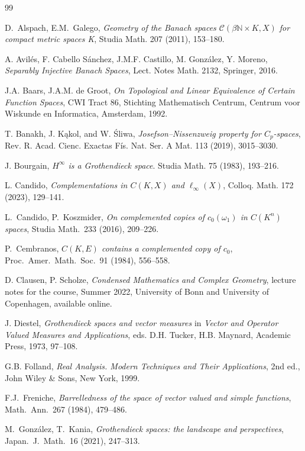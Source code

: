 \documentclass[12pt,fleqn]{amsart}
\numberwithin{equation}{section}
\theoremstyle{definition}
\def\C{\mathcal C}
\def\en{\mathbb N}
\begin{document}
\begin{thebibliography}{99}

 D.\ Alspach, E.M.\  Galego, {\em Geometry of the Banach spaces $\C(\beta\en\times K,X)$ for compact metric spaces K},
 Studia Math. 207 (2011),  153--180.

 A. Avil\'es, F. Cabello S\'anchez, J.M.F. Castillo, M. Gonz\'alez, Y. Moreno, {\em Separably Injective Banach Spaces}, Lect. Notes Math. 2132, Springer, 2016.

 J.A. Baars, J.A.M. de Groot, {\em On Topological and Linear Equivalence of Certain Function Spaces}, CWI Tract 86, Stichting Mathematisch Centrum, Centrum voor
Wiskunde en Informatica, Amsterdam, 1992.

T. Banakh, J. K\k{a}kol, and W. \'{S}liwa, {\em Josefson--Nissenzweig property for 
$C_p$-spaces}, Rev. R. Acad. Cienc. Exactas Fís. Nat. Ser. A Mat. 113 (2019), 3015--3030.

 J. Bourgain, {\em $H^\infty$ is a Grothendieck space}. Studia Math. 75 (1983), 193--216.

 L. Candido, {\em 
Complementations in $C(K,X)$ and $\ell_{\infty}(X)$}, 
Colloq. Math. 172 (2023),  129--141.

L.\ Candido, P.\  Koszmider, 
{\em On complemented copies of $c_0(\omega_1)$  in $C(K^n)$ spaces}, 
Studia  Math.\ 233 (2016),  209--226. 

  P.\  Cembranos, {\em $C(K,E)$ contains a complemented copy of $c_0$}, 
  Proc.\ Amer.\ Math.\ Soc.\ 91 (1984), 556--558.  

 D. Clausen, P. Scholze, {\em Condensed Mathematics and Complex Geometry}, lecture notes for the course, Summer 2022, University of Bonn and University of Copenhagen, available online.

J. Diestel, {\em Grothendieck spaces and vector measures} in {\em Vector and Operator Valued Measures and Applications}, eds. D.H. Tucker, H.B. Maynard, Academic Press, 1973, 97--108.

G.B. Folland, {\em Real Analysis. Modern Techniques and Their Applications}, 2nd ed., John Wiley \& Sons, New York, 1999. 

 F.J.\ Freniche, {\em 
Barrelledness of the space of vector valued and simple functions},
Math.\ Ann.\ 267 (1984),  479--486.  

M.\ Gonz\'alez, T.\  Kania, {\em 
Grothendieck spaces: the landscape and perspectives}, 
Japan.\ J.\ Math.\ 16 (2021),  247--313.


\end{thebibliography}
\end{document}
